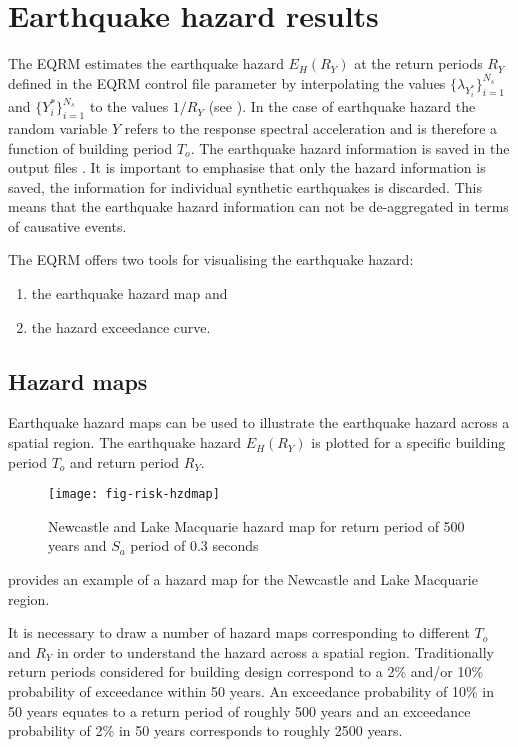 \section{Earthquake hazard results}
\label{sec:risk-hzd-results} The EQRM estimates the earthquake
hazard $E_H(R_Y)$ at the return periods $R_Y$ defined in the
EQRM control file parameter  by    
interpolating the values $\{ \lambda_{Y_i^*}\}_{i=1}^{N_s}$ and
$\{Y_i^*\}_{i=1}^{N_s}$ to the values $1/R_Y$ (see
). In the case of earthquake hazard the
random variable $Y$ refers to the response spectral
acceleration and is
therefore a function of building period $T_o$. The earthquake
hazard information is saved in the output files
. It is important to
emphasise that only the hazard information is saved, the
information for individual synthetic earthquakes is discarded.
This means that the earthquake hazard information can not be
de-aggregated in terms of causative events.

The EQRM offers two tools for visualising the earthquake hazard:
\begin{enumerate}
\item the earthquake hazard map and \item the hazard exceedance
curve.
\end{enumerate}

\subsection{Hazard maps}

Earthquake hazard maps can be used to illustrate the earthquake
hazard across a spatial region. The earthquake hazard $E_H(R_Y)$
is plotted for a specific building period $T_o$ and return period
$R_Y$.
\begin{figure}
\texttt{[image: fig-risk-hzdmap]}
\caption{Newcastle and Lake Macquarie hazard map for return period
of 500 years and $S_a$ period of 0.3 seconds}
\label{fig:risk-hazardmap}
\end{figure}
 provides an example of a hazard map for
the Newcastle and Lake Macquarie region.

It is necessary to draw a number of hazard maps corresponding to
different $T_o$ and $R_Y$ in order to understand the hazard across
a spatial region. Traditionally return periods considered for
building design correspond to a 2\% and/or 10\% probability of
exceedance within 50 years. An exceedance probability of 10\% in
50 years equates to a return period of roughly 500 years and an
exceedance probability of 2\% in 50 years corresponds to roughly
2500 years.

